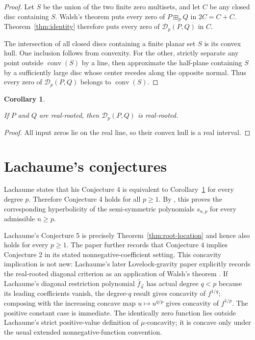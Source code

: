 \documentclass[11pt]{article}
\newtheorem{corollary}[theorem]{Corollary}
\begin{document}
\begin{proof}

Let \(S\) be the union of the two finite zero multisets, and let \(C\) be any
closed disc containing \(S\). Walsh's theorem puts every zero of
\(P\boxplus_pQ\) in \(2C=C+C\). Theorem~\ref{thm:identity} therefore puts every zero of
\(\mathcal D_p(P,Q)\) in \(C\).

The intersection of all closed discs containing a finite planar set \(S\) is
its convex hull. One inclusion follows from convexity. For the other, strictly
separate any point outside \(\operatorname{conv}(S)\) by a line, then
approximate the half-plane containing \(S\) by a sufficiently large disc whose
center recedes along the opposite normal. Thus every zero of
\(\mathcal D_p(P,Q)\) belongs to \(\operatorname{conv}(S)\).
\end{proof}


\Needspace{0.16\textheight}
\begin{corollary}
\label{cor:real-rooted}

If \(P\) and \(Q\) are real-rooted, then \(\mathcal D_p(P,Q)\) is real-rooted.

\end{corollary}

\begin{proof}

All input zeros lie on the real line, so their convex hull is a real interval.
\end{proof}


\section{Lachaume's conjectures}


Lachaume \cite[Theorem~4.9]{lachaume} states that his Conjecture 4 is equivalent to
Corollary~\ref{cor:real-rooted} for every degree \(p\). Therefore Conjecture 4 holds for all
\(p\ge1\). By \cite[Theorem~4.8]{lachaume}, this proves the corresponding hyperbolicity of
the semi-symmetric polynomials \(s_{n,p}\) for every admissible \(n\ge p\).

Lachaume's Conjecture 5 is precisely Theorem~\ref{thm:root-location} and hence also holds for every
\(p\ge1\). The paper further records that Conjecture 4 implies Conjecture 2 in
its stated nonnegative-coefficient setting. This concavity implication is not
new: Lachaume's later Lovelock-gravity paper explicitly records the
real-rooted diagonal criterion as an application of Walsh's theorem
\cite[Theorem~2.7(d)]{lachaume-lovelock}. If Lachaume's diagonal
restriction polynomial \(\bar f_{\vec a}\) has actual degree \(q<p\) because
its leading coefficients vanish, the degree-\(q\) result gives concavity of
\(f^{1/q}\); composing with the increasing concave map
\(u\mapsto u^{q/p}\) gives concavity of \(f^{1/p}\). The positive constant
case is immediate. The identically zero function lies outside Lachaume's
strict positive-value definition of \(\mu\)-concavity; it is concave only
under the usual extended nonnegative-function convention.
\end{document}
